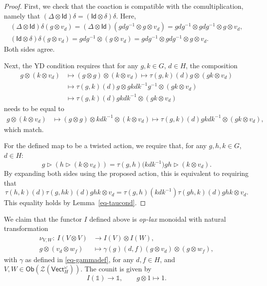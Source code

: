 \documentclass[pdftex]{sigma}
\numberwithin{equation}{section}
\newcommand{\ide}{\mathsf{Id}}
\newcommand{\Ob}{\mathsf{Ob}}
\newcommand{\one}{\mathds{1}}
\newcommand{\Vect}{\mathsf{Vect}}
\newcommand{\cZ}{\mathcal{Z}}
\newcommand{\rI}{I}
\begin{document}
\begin{proof}
First, we check that the coaction is compatible with the comultiplication, namely that $ ( \Delta \otimes \ide ) \delta = (\ide \otimes \delta ) \delta$. Here,{\samepage
 \begin{gather*}
 ( \Delta \otimes \ide ) \delta ( g \otimes v_d ) = ( \Delta \otimes \ide ) ( gdg^{-1} \otimes g \otimes v_d ) = gdg^{-1} \otimes gdg^{-1} \otimes g \otimes v_d, \\
 ( \ide \otimes \delta ) \delta ( g \otimes v_d ) = gdg^{-1} \otimes ( g \otimes v_d ) = gdg^{-1} \otimes gdg^{-1} \otimes g \otimes v_d.
 \end{gather*}
Both sides agree.}

Next, the YD condition requires that for any $g, k \in G$, $d \in H$, the composition
 \begin{align*}
 g \otimes ( k \otimes v_d ) & \mapsto ( g \otimes g ) \otimes ( k \otimes v_d )\mapsto \tau ( g,k ) ( d ) g \otimes ( gk \otimes v_d ) \\ & \mapsto \tau ( g,k ) ( d ) g \otimes gkdk^{-1}g^{-1} \otimes ( gk \otimes v_d )
 \\&\mapsto \tau ( g,k ) ( d ) gkdk^{-1} \otimes ( gk \otimes v_d )
 \end{align*}
 needs to be equal to
 \begin{align*}
 g \otimes ( k \otimes v_d ) & \mapsto ( g \otimes g ) \otimes kdk^{-1} \otimes ( k \otimes v_d ) \mapsto \tau ( g,k ) ( d ) gkdk^{-1} \otimes ( gk \otimes v_d ),
 \end{align*}
which match.

For the defined map to be a twisted action, we require that, for any $ g,h,k \in G$, $d \in H$:
 \begin{equation*}
 g \vartriangleright (h \vartriangleright ( k \otimes v_d )) = \tau(g,h)\big(kdk^{-1}\big) gh \vartriangleright (k \otimes v_d ).
 \end{equation*}
By expanding both sides using the proposed action, this is equivalent to requiring that
 \begin{equation*}
 \tau(h,k)(d)\tau(g,hk)(d)ghk \otimes v_d = \tau(g,h)(kdk^{-1})\tau(gh,k)(d)ghk \otimes v_d.
 \end{equation*}
This equality holds by Lemma~\ref{eq-taucond}.
\end{proof}

We claim that the functor $I$ defined above is \emph{op-lax} monoidal with natural transformation
\begin{align*}
 \nu_{V,W} \colon\ \rI ( V \otimes V ) & \to \rI ( V ) \otimes \rI ( W ), \nonumber \\
 g \otimes ( v_d \otimes w_f ) & \mapsto \gamma ( g ) ( d,f ) ( g \otimes v_d ) \otimes ( g \otimes w_f ),
\end{align*}
with $\gamma$ as defined in \eqref{eq-gammadef}, for any $d,f \in H$, and $V,W \in \Ob ( \cZ( \Vect_H^\omega))$. The counit is given by
\begin{equation*}
 \rI(\one)\to \one, \qquad g\otimes 1\mapsto 1.
\end{equation*}
\end{document}
